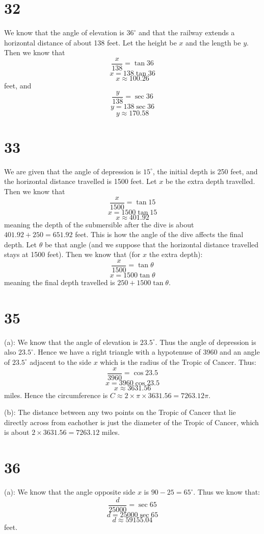 \documentclass{article}
\theoremstyle{definition}
\newcommand{\?}{\stackrel{?}{=}}
\begin{document}
\section*{32}
We know that the angle of elevation is $36^\circ$ and that the railway extends a horizontal distance of about 138 feet. Let the height be $x$ and the length be $y$. Then we know that 
\[ \frac{x}{138}=\tan 36 \]
\[ x=138\tan 36 \]
\[ x\approx 100.26 \] feet,
and \[ \frac{y}{138}=\sec 36 \]
\[ y=138\sec 36 \]
\[ y\approx 170.58 \]

\section*{33}
We are given that the angle of depression is $15^\circ$, the initial depth is 250 feet, and the horizontal distance travelled is 1500 feet. Let $x$ be the extra depth travelled. Then we know 
that \[ \frac{x}{1500}=\tan 15 \]
\[ x=1500\tan 15 \]
\[ x\approx 401.92 \]
meaning the depth of the submersible after the dive is about $401.92+250=651.92$ feet. This is how the angle of the dive affects the final depth. Let $\theta$ be that angle (and we suppose that 
the horizontal distance travelled stays at 1500 feet). Then we know that (for $x$ the extra depth):
\[ \frac{x}{1500}=\tan\theta \]
\[ x=1500\tan\theta \]
meaning the final depth travelled is $250+1500\tan\theta$.

\section*{35}
(a): We know that the angle of elevation is $23.5^\circ$. Thus the angle of depression is also $23.5^\circ$. Hence we have a right triangle with a hypotenuse of 3960 and an angle of 
$23.5^\circ$ adjacent to the side $x$ which is the radius of the Tropic of Cancer. Thus:
\[ \frac{x}{3960}=\cos 23.5 \]
\[ x=3960\cos 23.5 \]
\[ x\approx 3631.56 \] miles. Hence the circumference is $C\approx 2\times \pi\times 3631.56=7263.12\pi$.


(b): The distance between any two points on the Tropic of Cancer that lie directly across from eachother is just the diameter of the Tropic of Cancer, which is
about $2\times 3631.56=7263.12$ miles.

\section*{36}
(a): We know that the angle opposite side $x$ is $90-25=65^\circ$. Thus we know that:
\[ \frac{d}{25000}=\sec 65 \]
\[ d=25000\sec 65 \]
\[ d\approx 59155.04 \] feet.
\end{document}
